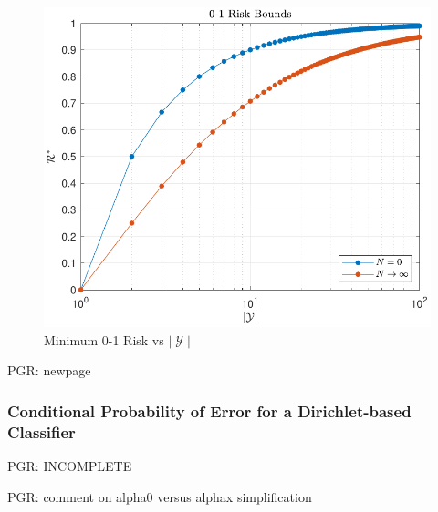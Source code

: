 \documentclass[12pt]{report}
\DeclareMathOperator{\Ycal}{\mathcal{Y}}
\begin{document}
\begin{figure}
\centering
\includegraphics[width=0.7\linewidth]{Risk_01_uni_N_bounds.pdf}
\caption{Minimum 0-1 Risk vs $|\Ycal|$}
\label{fig:Risk_01_uni_N_bounds}
\end{figure}




\newpage
PGR: newpage

\subsubsection{Conditional Probability of Error for a Dirichlet-based Classifier}

PGR: INCOMPLETE

PGR: comment on alpha0 versus alphax simplification
\end{document}
